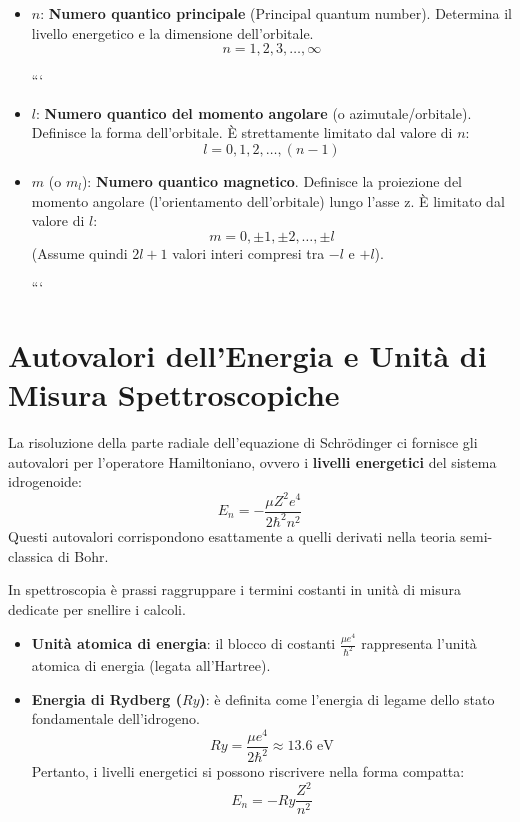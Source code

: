 \begin{itemize}
\item $n$: \textbf{Numero quantico principale} (Principal quantum number). Determina il livello energetico e la dimensione dell'orbitale.
\begin{equation}
n = 1, 2, 3, \ldots, \infty
\end{equation}

```
\item $l$: \textbf{Numero quantico del momento angolare} (o azimutale/orbitale). Definisce la forma dell'orbitale. È strettamente limitato dal valore di $n$:
\begin{equation}
    l = 0, 1, 2, \ldots, (n-1)
\end{equation}

\item $m$ (o $m_l$): \textbf{Numero quantico magnetico}. Definisce la proiezione del momento angolare (l'orientamento dell'orbitale) lungo l'asse z. È limitato dal valore di $l$:
\begin{equation}
    m = 0, \pm 1, \pm 2, \ldots, \pm l
\end{equation}
(Assume quindi $2l+1$ valori interi compresi tra $-l$ e $+l$).

```

\end{itemize}

\section{Autovalori dell'Energia e Unità di Misura Spettroscopiche}

La risoluzione della parte radiale dell'equazione di Schrödinger ci fornisce gli autovalori per l'operatore Hamiltoniano, ovvero i \textbf{livelli energetici} del sistema idrogenoide:
\begin{equation}
E_n = - \frac{\mu Z^2 e^4}{2 \hbar^2 n^2}
\end{equation}
Questi autovalori corrispondono esattamente a quelli derivati nella teoria semi-classica di Bohr.

In spettroscopia è prassi raggruppare i termini costanti in unità di misura dedicate per snellire i calcoli.
\begin{itemize}
\item \textbf{Unità atomica di energia}: il blocco di costanti $\frac{\mu e^4}{\hbar^2}$ rappresenta l'unità atomica di energia (legata all'Hartree).
\item \textbf{Energia di Rydberg ($Ry$)}: è definita come l'energia di legame dello stato fondamentale dell'idrogeno.
\begin{equation}
Ry = \frac{\mu e^4}{2 \hbar^2} \approx 13.6 \text{ eV}
\end{equation}
Pertanto, i livelli energetici si possono riscrivere nella forma compatta:
\begin{equation}
E_n = - Ry \frac{Z^2}{n^2}
\end{equation}
\end{itemize}

